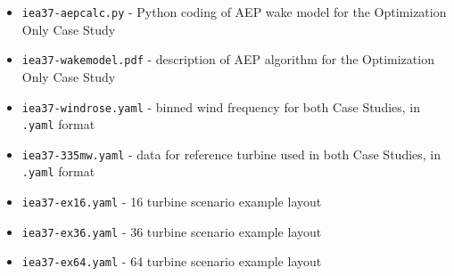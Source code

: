 \documentclass[10pt]{article}
\begin{document}
    \begin{itemize}[noitemsep,topsep=0pt,parsep=0pt,partopsep=0pt]
        \item \texttt{iea37-aepcalc.py} - Python coding of AEP wake model for the Optimization Only Case Study
        \item \texttt{iea37-wakemodel.pdf} - description of AEP algorithm for the Optimization Only Case Study
        \item \texttt{iea37-windrose.yaml} - binned wind frequency for both Case Studies, in \texttt{.yaml} format
        \item \texttt{iea37-335mw.yaml} - data for reference turbine used in both Case Studies, in \texttt{.yaml} format
        \item \texttt{iea37-ex16.yaml} - 16 turbine scenario example layout
        \item \texttt{iea37-ex36.yaml} - 36 turbine scenario example layout
        \item \texttt{iea37-ex64.yaml} - 64 turbine scenario example layout
    \end{itemize}



\end{document}

